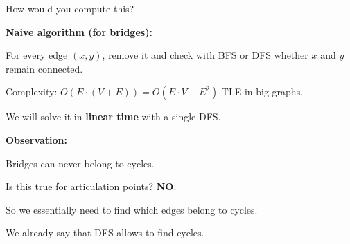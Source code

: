 \documentclass[10pt]{beamer}
\begin{document}
\begin{frame}

How would you compute this?

\pause

\vspace{1cm}

\textbf{Naive algorithm (for bridges):}

\vspace{0.5cm}

For every edge $(x, y)$, remove it and check with \textsf{BFS} or \textsf{DFS} whether $x$ and $y$ remain connected.

\vspace{0.5cm}

Complexity: $O(E \cdot (V + E)) = O(E \cdot V + E^2)$ {\color{red!50!white} TLE} in big graphs.

\vspace{1cm}

We will solve it in \textbf{linear time} with a single DFS.

\end{frame}

\begin{frame}

\textbf{Observation:}

\vspace{0.5cm}

Bridges can never belong to cycles.

\vspace{0.5cm}

Is this true for articulation points? \pause \textbf{NO}.

\vspace{0.5cm}

\begin{center}
\end{center}

\vspace{0.5cm}

So we essentially need to find which edges belong to cycles.

\vspace{0.5cm}

We already say that DFS allows to find cycles.

\end{frame}
\end{document}
